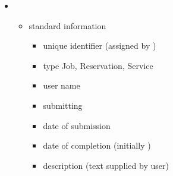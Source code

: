     \begin{itemize}
      \item

      \begin{itemize}
      \item standard information
        \begin{itemize}
          \item unique identifier (assigned by \varDUCC)
          \item type {Job, Reservation, Service}
          \item user name
          \item submitting \varPID
          \item date of submission
          \item date of completion (initially \varNull)
          \item description (text supplied by user)
        \end{itemize} 




\end{itemize}
\end{itemize}
